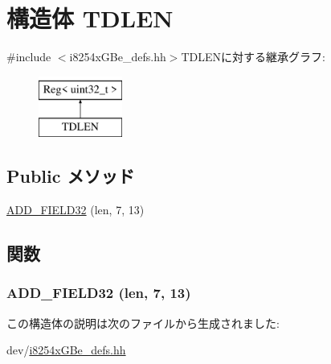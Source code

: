 \hypertarget{structiGbReg_1_1Regs_1_1TDLEN}{
\section{構造体 TDLEN}
\label{structiGbReg_1_1Regs_1_1TDLEN}
}


{\ttfamily \#include $<$i8254xGBe\_\-defs.hh$>$}TDLENに対する継承グラフ:\begin{figure}[H]
\begin{center}
\leavevmode
\includegraphics[height=2cm]{structiGbReg_1_1Regs_1_1TDLEN}
\end{center}
\end{figure}
\subsection*{Public メソッド}
\begin{DoxyCompactItemize}
\item 
\hyperlink{structiGbReg_1_1Regs_1_1TDLEN_a6fbef5d44faf04ee8eafeddc2bbcd708}{ADD\_\-FIELD32} (len, 7, 13)
\end{DoxyCompactItemize}


\subsection{関数}
\hypertarget{structiGbReg_1_1Regs_1_1TDLEN_a6fbef5d44faf04ee8eafeddc2bbcd708}{
\subsubsection[{ADD\_\-FIELD32}]{\setlength{\rightskip}{0pt plus 5cm}ADD\_\-FIELD32 (len, \/  7, \/  13)}}
\label{structiGbReg_1_1Regs_1_1TDLEN_a6fbef5d44faf04ee8eafeddc2bbcd708}


この構造体の説明は次のファイルから生成されました:\begin{DoxyCompactItemize}
\item 
dev/\hyperlink{i8254xGBe__defs_8hh}{i8254xGBe\_\-defs.hh}\end{DoxyCompactItemize}

